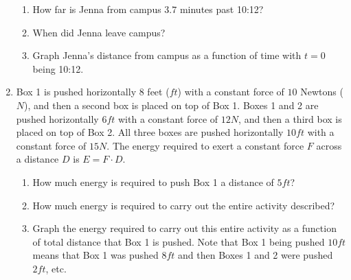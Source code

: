 \documentclass[12pt]{report}
\begin{document}
\begin{enumerate}
\begin{enumerate}
\item How far is Jenna from campus $3.7$ minutes past 10:12?

\item When did Jenna leave campus?

\item Graph Jenna's distance from campus as a function of time with $t=0$ being 10:12. 

\end{enumerate}

\pagebreak

\item Box 1 is pushed horizontally $8$ feet ($ft$) with a constant force of $10$ Newtons ($N$), and then a second box is placed on top of Box 1. Boxes 1 and 2 are pushed horizontally $6ft$ with a constant force of $12N$, and then a third box is placed on top of Box 2. All three boxes are pushed horizontally $10ft$ with a constant force of $15N$. The energy required to exert a constant force $F$ across a distance $D$ is $E=F\cdot D$. 

\begin{enumerate}

\item How much energy is required to push Box 1 a distance of $5ft$?

\item How much energy is required to carry out the entire activity described?

\item Graph the energy required to carry out this entire activity as a function of total distance that Box 1 is pushed. Note that Box 1 being pushed $10ft$ means that Box 1 was pushed $8ft$ and then Boxes 1 and 2 were pushed $2ft$, etc.

\end{enumerate}



\end{enumerate}
\end{document}

